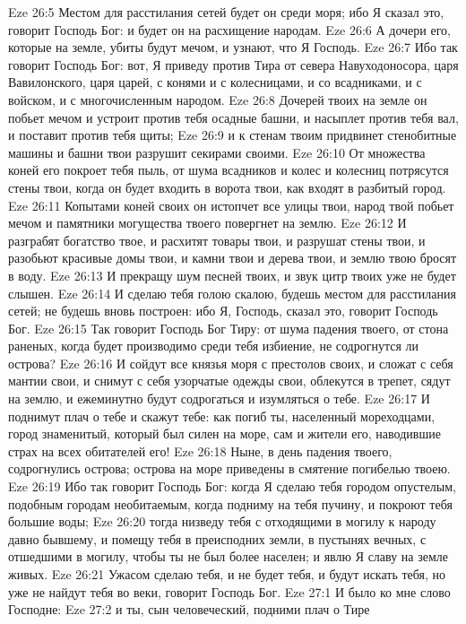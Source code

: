 Eze 26:5  Местом для расстилания сетей будет он среди моря; ибо Я сказал это, говорит Господь Бог: и будет он на расхищение народам.
Eze 26:6  А дочери его, которые на земле, убиты будут мечом, и узнают, что Я Господь.
Eze 26:7  Ибо так говорит Господь Бог: вот, Я приведу против Тира от севера Навуходоносора, царя Вавилонского, царя царей, с конями и с колесницами, и со всадниками, и с войском, и с многочисленным народом.
Eze 26:8  Дочерей твоих на земле он побьет мечом и устроит против тебя осадные башни, и насыплет против тебя вал, и поставит против тебя щиты;
Eze 26:9  и к стенам твоим придвинет стенобитные машины и башни твои разрушит секирами своими.
Eze 26:10  От множества коней его покроет тебя пыль, от шума всадников и колес и колесниц потрясутся стены твои, когда он будет входить в ворота твои, как входят в разбитый город.
Eze 26:11  Копытами коней своих он истопчет все улицы твои, народ твой побьет мечом и памятники могущества твоего повергнет на землю.
Eze 26:12  И разграбят богатство твое, и расхитят товары твои, и разрушат стены твои, и разобьют красивые домы твои, и камни твои и дерева твои, и землю твою бросят в воду.
Eze 26:13  И прекращу шум песней твоих, и звук цитр твоих уже не будет слышен.
Eze 26:14  И сделаю тебя голою скалою, будешь местом для расстилания сетей; не будешь вновь построен: ибо Я, Господь, сказал это, говорит Господь Бог.
Eze 26:15  Так говорит Господь Бог Тиру: от шума падения твоего, от стона раненых, когда будет производимо среди тебя избиение, не содрогнутся ли острова?
Eze 26:16  И сойдут все князья моря с престолов своих, и сложат с себя мантии свои, и снимут с себя узорчатые одежды свои, облекутся в трепет, сядут на землю, и ежеминутно будут содрогаться и изумляться о тебе.
Eze 26:17  И поднимут плач о тебе и скажут тебе: как погиб ты, населенный мореходцами, город знаменитый, который был силен на море, сам и жители его, наводившие страх на всех обитателей его!
Eze 26:18  Ныне, в день падения твоего, содрогнулись острова; острова на море приведены в смятение погибелью твоею.
Eze 26:19  Ибо так говорит Господь Бог: когда Я сделаю тебя городом опустелым, подобным городам необитаемым, когда подниму на тебя пучину, и покроют тебя большие воды;
Eze 26:20  тогда низведу тебя с отходящими в могилу к народу давно бывшему, и помещу тебя в преисподних земли, в пустынях вечных, с отшедшими в могилу, чтобы ты не был более населен; и явлю Я славу на земле живых.
Eze 26:21  Ужасом сделаю тебя, и не будет тебя, и будут искать тебя, но уже не найдут тебя во веки, говорит Господь Бог.
Eze 27:1  И было ко мне слово Господне:
Eze 27:2  и ты, сын человеческий, подними плач о Тире
